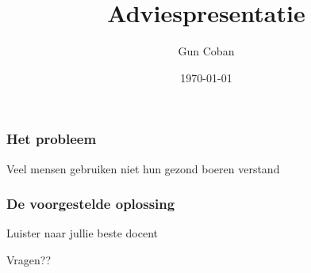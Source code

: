 \documentclass{beamer}
\title{Adviespresentatie}
\subtitle{}
\author{Gun Coban}
\institute{Hogeschool Rotterdam}
\date{\today}
\begin{document}
\begin{frame}
	\titlepage
\end{frame}
\begin{frame}
\frametitle{Het probleem}
\small{Veel mensen gebruiken niet hun gezond boeren verstand}
\end{frame}
\begin{frame}
\frametitle{De voorgestelde oplossing}
\small{Luister naar jullie beste docent}
\end{frame}
\begin{frame}
\Huge{Vragen??}
\end{frame}
\end{document}
